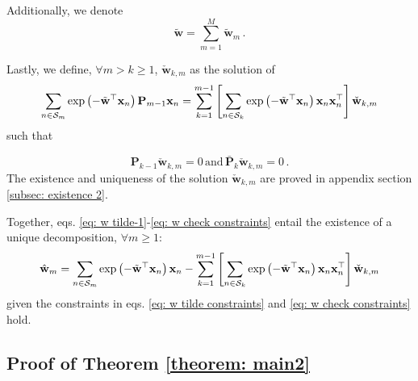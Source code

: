 \documentclass[twoside,11pt,english]{article}
\begin{document}
{Additionally, we denote
\[
\tilde{\mathbf{w}}=\sum_{m=1}^{M}\tilde{\mathbf{w}}_{m}\,.
\]

Lastly, we define, $\forall m>k\geq1$, $\check{\mathbf{w}}_{k,m}$
as the solution of 
\begin{equation}
\sum_{n\in\mathcal{S}_{m}}\exp\left(-\tilde{\mathbf{w}}^{\top}\mathbf{x}_{n}\right)\mathbf{P}_{m-1}\mathbf{x}_{n}=\sum_{k=1}^{m-1}\left[\sum_{n\in\mathcal{S}_{k}}\exp\left(-\tilde{\mathbf{w}}^{\top}\mathbf{x}_{n}\right)\mathbf{x}_{n}\mathbf{x}_{n}^{\top}\right]\check{\mathbf{w}}_{k,m}\label{eq: w check}
\end{equation}
such that

\begin{equation}
\mathbf{P}_{k-1}\check{\mathbf{w}}_{k,m}=0\,\mathrm{and}\,\mathbf{\bar{P}}_{k}\check{\mathbf{w}}_{k,m}=0\,.\label{eq: w check constraints}
\end{equation}
The existence and uniqueness of the solution $\check{\mathbf{w}}_{k,m}$
are proved in appendix section \ref{subsec: existence 2}. 

Together, eqs. \ref{eq: w tilde-1}-\ref{eq: w check constraints}
entail the existence of a unique decomposition, $\forall m\geq1:$
\begin{equation}
\hat{\mathbf{w}}_{m}=\sum_{n\in\mathcal{S}_{m}}\exp\left(-\tilde{\mathbf{w}}^{\top}\mathbf{x}_{n}\right)\mathbf{x}_{n}-\sum_{k=1}^{m-1}\left[\sum_{n\in\mathcal{S}_{k}}\exp\left(-\tilde{\mathbf{w}}^{\top}\mathbf{x}_{n}\right)\mathbf{x}_{n}\mathbf{x}_{n}^{\top}\right]\check{\mathbf{w}}_{k,m}\label{eq: w_hat full decomposition}
\end{equation}
given the constraints in eqs. \ref{eq: w tilde constraints} and \ref{eq: w check constraints}
hold.

\subsection{Proof of Theorem \ref{theorem: main2}}

}
\end{document}

